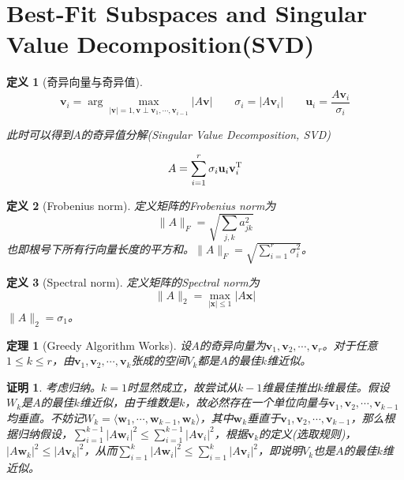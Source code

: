 \documentclass[8pt]{article}
\theoremstyle{compact}
\newtheorem{theorem}{定理}
\newtheorem{definition}{定义}
\newtheorem{Proof}{证明}
\def\le{\leqslant}
\begin{document}
\newpage
\section{Best-Fit Subspaces and Singular Value Decomposition(SVD)}

\begin{definition}[奇异向量与奇异值]
	\begin{equation}
	\mathbf v_i = \arg \max_{|\mathbf v| = 1, \mathbf v \perp \mathbf v_1, \cdots, \mathbf v_{i-1}} |A\mathbf v| \qquad \sigma_i = |A\mathbf v_i| \qquad \mathbf u_i = \frac{A\mathbf v_i}{\sigma_i}
	\end{equation}
	
	此时可以得到$A$的奇异值分解(Singular Value Decomposition, SVD)
	
	\begin{equation}
	A = \sum_{i=1}^{r}\sigma_i \mathbf u_i \mathbf v_i^{\text T}
	\end{equation}	
\end{definition}
\begin{definition}[Frobenius norm]
	定义矩阵的Frobenius norm为
	\begin{equation}
	\|A\|_F = \sqrt{\sum_{j,k}a_{jk}^2}
	\end{equation}
	也即根号下所有行向量长度的平方和。$\|A\|_F = \sqrt{\sum\limits_{i=1}^{r}\sigma_i^2}$。
\end{definition}
\begin{definition}[Spectral norm]
	定义矩阵的Spectral norm为
\begin{equation}
\|A\|_2 = \max_{|\mathbf x| \le 1}|A \mathbf x|
\end{equation}
$\|A\|_2 = \sigma_1$。	
\end{definition}
\begin{theorem}[Greedy Algorithm Works]
	设$A$的奇异向量为$\mathbf v_1, \mathbf v_2, \cdots, \mathbf v_r$。对于任意$1 \le k \le r$，由$\mathbf v_1, \mathbf v_2, \cdots, \mathbf v_k$张成的空间$V_k$都是$A$的最佳$k$维近似。
\end{theorem}
\begin{Proof}
	考虑归纳。$k=1$时显然成立，故尝试从$k-1$维最佳推出$k$维最佳。假设$W_k$是$A$的最佳$k$维近似，由于维数是$k$，故必然存在一个单位向量与$\mathbf v_1, \mathbf v_2, \cdots, \mathbf v_{k-1}$均垂直。不妨记$W_k = \langle \mathbf w_1, \cdots, \mathbf w_{k-1}, \mathbf w_k
	\rangle$，其中$\mathbf w_k$垂直于$\mathbf v_1, \mathbf v_2, \cdots, \mathbf v_{k-1}$，那么根据归纳假设，$\sum\limits_{i=1}^{k-1}|A\mathbf w_i|^2 \le \sum\limits_{i=1}^{k-1}|A\mathbf v_i|^2$，根据$\mathbf v_k$的定义(选取规则)，$|A\mathbf w_k|^2 \le |A\mathbf v_k|^2$，从而$\sum\limits_{i=1}^{k}|A\mathbf w_i|^2 \le \sum\limits_{i=1}^{k}|A\mathbf v_i|^2$，即说明$V_k$也是$A$的最佳$k$维近似。
\end{Proof}
\end{document}
